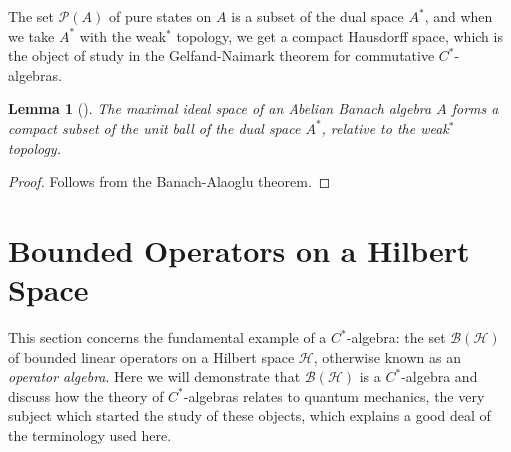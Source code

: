 \documentclass[11pt,a4paper]{report}
\theoremstyle{plain}
\newtheorem{lemma}{Lemma}
\theoremstyle{definition}
\newcommand{\1}{\mathbbm{1}}
\renewcommand{\H}{\mathcal{H}}
\newcommand{\B}{\mathcal{B}}
\renewcommand{\P}[1]{\mathscr{P}(#1)}
\begin{document}
The set $\P A$ of pure states on $A$ is a subset of the dual space $A^\ast$, and 
when we take $A^\ast$ with the weak$^\ast$ topology, we get a compact Hausdorff 
space, which is the object of study in the Gelfand-Naimark theorem for 
commutative $C^\ast$-algebras.


\begin{lemma}[{\cite[3.2.20]{kadison83}}]\label{lemma:3220}
	The maximal ideal space of an Abelian Banach algebra $A$ forms a compact subset of 
	the unit ball of the dual space $A^\ast$, relative to the weak$^\ast$ topology.
\end{lemma}
\begin{proof}
	Follows from the Banach-Alaoglu theorem.
\end{proof}




\section{Bounded Operators on a Hilbert Space}\label{section:bh}
This section concerns the fundamental example of a $C^\ast$-algebra: the set 
$\B(\H)$ of bounded linear operators on a Hilbert space $\H$, otherwise known as 
an \emph{operator algebra}. Here we will demonstrate that $\B(\H)$ is a 
$C^\ast$-algebra and discuss how the theory of $C^\ast$-algebras relates to 
quantum mechanics, the very subject which started the study of these objects, 
which explains a good deal of the terminology used here. 
\end{document}
